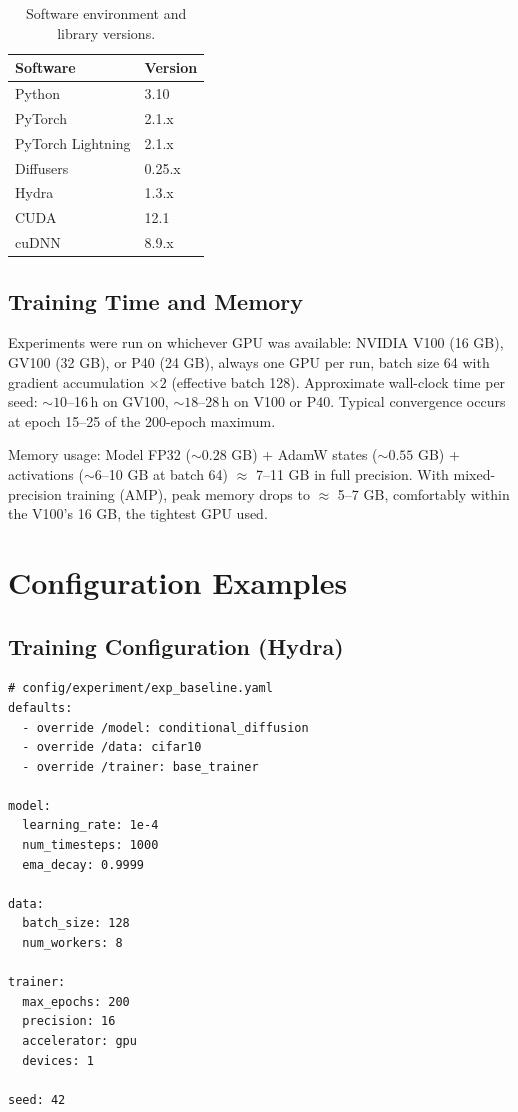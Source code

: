 \begin{table}[htbp]
  \centering
  \caption{Software environment and library versions.}
  \label{tab:appC:software}\label{app:dependencies}
  \begin{tabular}{ll}
    \toprule
    Software & Version \\
    \midrule
    Python & 3.10 \\
    PyTorch & 2.1.x \\
    PyTorch Lightning & 2.1.x \\
    Diffusers & 0.25.x \\
    Hydra & 1.3.x \\
    CUDA & 12.1 \\
    cuDNN & 8.9.x \\
    \bottomrule
  \end{tabular}
\end{table}

\subsection{Training Time and Memory}
\label{app:experimental-config:resources:memory}

Experiments were run on whichever GPU was available: NVIDIA V100 (16 GB), GV100 (32 GB), or P40 (24 GB), always one GPU per run, batch size 64 with gradient accumulation $\times 2$ (effective batch 128). Approximate wall-clock time per seed: ${\sim}10$--16\,h on GV100, ${\sim}18$--28\,h on V100 or P40. Typical convergence occurs at epoch 15--25 of the 200-epoch maximum.

Memory usage: Model FP32 (${\sim}0.28$ GB) + AdamW states (${\sim}0.55$ GB) + activations (${\sim}6$--10 GB at batch 64) $\approx$ 7--11 GB in full precision. With mixed-precision training (AMP), peak memory drops to $\approx$ 5--7 GB, comfortably within the V100's 16 GB, the tightest GPU used.


\section{Configuration Examples}
\label{app:experimental-config:examples}

\subsection{Training Configuration (Hydra)}
\label{app:experimental-config:examples:hydra}

\begin{verbatim}
# config/experiment/exp_baseline.yaml
defaults:
  - override /model: conditional_diffusion
  - override /data: cifar10
  - override /trainer: base_trainer

model:
  learning_rate: 1e-4
  num_timesteps: 1000
  ema_decay: 0.9999

data:
  batch_size: 128
  num_workers: 8

trainer:
  max_epochs: 200
  precision: 16
  accelerator: gpu
  devices: 1

seed: 42
\end{verbatim}

